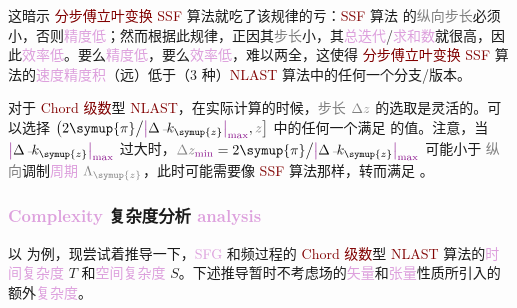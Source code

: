 这暗示 \textcolor{Maroon}{分步傅立叶变换 SSF} 算法就吃了该规律的亏：\textcolor{Maroon}{SSF} 算法 的\textcolor{gray}{纵向}\textcolor{gray}{步长}必须小，否则\textcolor{Plum}{精度低}；然而根据此规律，正因其\textcolor{gray}{步长}小，其\textcolor{Plum}{总迭代}/\textcolor{Plum}{求和数}就很高，因此\textcolor{Plum}{效率低}。要么\textcolor{Plum}{精度低}，要么\textcolor{Plum}{效率低}，难以两全，这使得 \textcolor{Maroon}{分步傅立叶变换 SSF} 算法的\textcolor{Plum}{速度精度积}（远）低于（3 种）\textcolor{Maroon}{NLAST} 算法中的任何一个分支/版本。

对于 \textcolor{Maroon}{Chord 级数}型 \textcolor{Maroon}{NLAST}，在实际计算的时候，\textcolor{gray}{步长} $\mathcolor{gray}{\Delta z}$ 的选取是灵活的。可以选择 $\left( 2 \symup{\pi} \big/ \textcolor{Plum}{\left| \textcolor{black}{\Delta \xint{\begin{smallmatrix} ~ \\ {}^{}_{\mathcolor{gray}{-}} \\ ~ \end{smallmatrix}}{15}{k}_{\symup{z}} } \right|_{\max}}, \mathcolor{gray}{z} \right]$ 中的任何一个满足  的值。注意，当 $\textcolor{Plum}{\left| \textcolor{black}{\Delta \xint{\begin{smallmatrix} ~ \\ {}^{}_{\mathcolor{gray}{-}} \\ ~ \end{smallmatrix}}{15}{k}_{\symup{z}} } \right|_{\max}}$ 过大时，$\mathcolor{gray}{\Delta z}_{\textcolor{Plum}{\min}} = 2 \symup{\pi} \big/ \textcolor{Plum}{\left| \textcolor{black}{\Delta \xint{\begin{smallmatrix} ~ \\ {}^{}_{\mathcolor{gray}{-}} \\ ~ \end{smallmatrix}}{15}{k}_{\symup{z}} } \right|_{\max}}$ 可能小于 \textcolor{gray}{纵向}\textcolor{NavyBlue}{调制}\textcolor{Plum}{周期} $\mathcolor{gray}{\Lambda_{\symup{z}}}$，此时可能需要像 \textcolor{Maroon}{SSF} 算法那样，转而满足 。

\subsubsection{\textcolor{Plum}{Complexity} 复杂度分析 \textcolor{Plum}{analysis}}\label{sssec:NLAST_complexity}

以  为例，现尝试着推导一下，\textcolor{Plum}{SFG} 和频过程的 \textcolor{Maroon}{Chord 级数}型 \textcolor{Maroon}{NLAST} 算法的\textcolor{Plum}{时间复杂度} $T$ 和\textcolor{Plum}{空间复杂度} $S$。下述推导暂时不考虑\textcolor{NavyBlue}{场}的\textcolor{Plum}{矢量}和\textcolor{Plum}{张量}性质所引入的额外\textcolor{Plum}{复杂度}。

